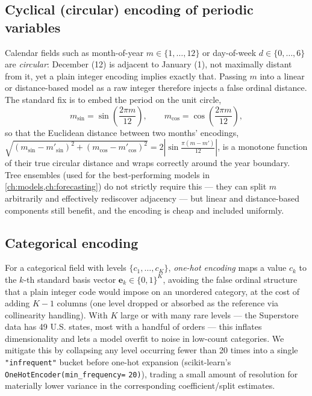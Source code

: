 \subsection{Cyclical (circular) encoding of periodic variables}
Calendar fields such as month-of-year $m \in \{1,\dots,12\}$ or
day-of-week $d\in\{0,\dots,6\}$ are \emph{circular}: December (12) is
adjacent to January (1), not maximally distant from it, yet a plain
integer encoding implies exactly that. Passing $m$ into a linear or
distance-based model as a raw integer therefore injects a false ordinal
distance. The standard fix is to embed the period on the unit circle,
\begin{equation}
  m_{\sin} = \sin\!\left(\frac{2\pi m}{12}\right), \qquad
  m_{\cos} = \cos\!\left(\frac{2\pi m}{12}\right),
  \label{eq:cyclical}
\end{equation}
so that the Euclidean distance between two months' encodings,
$\sqrt{(m_{\sin}-m'_{\sin})^2+(m_{\cos}-m'_{\cos})^2} =
2\left|\sin\frac{\pi(m-m')}{12}\right|$, is a monotone function of their
true circular distance and wraps correctly around the year boundary.
Tree ensembles (used for the best-performing models in
\cref{ch:models,ch:forecasting}) do not strictly require this — they can
split $m$ arbitrarily and effectively rediscover adjacency — but linear
and distance-based components still benefit, and the encoding is cheap
and included uniformly.

\subsection{Categorical encoding}
For a categorical field with levels $\{c_1,\dots,c_K\}$, \emph{one-hot
encoding} maps a value $c_k$ to the $k$-th standard basis vector
$\mathbf{e}_k \in \{0,1\}^K$, avoiding the false ordinal structure that
a plain integer code would impose on an unordered category, at the cost
of adding $K-1$ columns (one level dropped or absorbed as the reference
via collinearity handling). With $K$ large or with many rare levels — the
Superstore data has 49 U.S. states, most with a handful of orders — this
inflates dimensionality and lets a model overfit to noise in
low-count categories. We mitigate this by collapsing any level occurring
fewer than 20 times into a single \texttt{"infrequent"} bucket before
one-hot expansion (scikit-learn's \texttt{OneHotEncoder(min\_frequency=}
\texttt{20)}), trading a small amount of resolution for materially lower
variance in the corresponding coefficient/split estimates.

